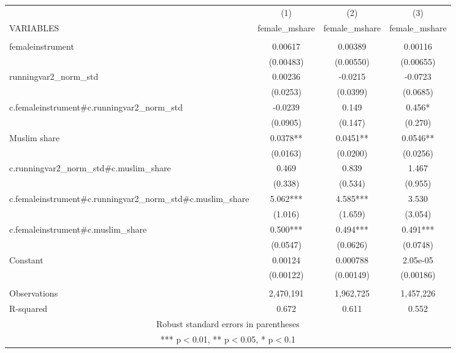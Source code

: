 \begin{tabular}{lccc} \hline
 & (1) & (2) & (3) \\
VARIABLES & female\_mshare & female\_mshare & female\_mshare \\ \hline
 &  &  &  \\
femaleinstrument & 0.00617 & 0.00389 & 0.00116 \\
 & (0.00483) & (0.00550) & (0.00655) \\
runningvar2\_norm\_std & 0.00236 & -0.0215 & -0.0723 \\
 & (0.0253) & (0.0399) & (0.0685) \\
c.femaleinstrument\#c.runningvar2\_norm\_std & -0.0239 & 0.149 & 0.456* \\
 & (0.0905) & (0.147) & (0.270) \\
Muslim share & 0.0378** & 0.0451** & 0.0546** \\
 & (0.0163) & (0.0200) & (0.0256) \\
c.runningvar2\_norm\_std\#c.muslim\_share & 0.469 & 0.839 & 1.467 \\
 & (0.338) & (0.534) & (0.955) \\
c.femaleinstrument\#c.runningvar2\_norm\_std\#c.muslim\_share & 5.062*** & 4.585*** & 3.530 \\
 & (1.016) & (1.659) & (3.054) \\
c.femaleinstrument\#c.muslim\_share & 0.500*** & 0.494*** & 0.491*** \\
 & (0.0547) & (0.0626) & (0.0748) \\
Constant & 0.00124 & 0.000788 & 2.05e-05 \\
 & (0.00122) & (0.00149) & (0.00186) \\
 &  &  &  \\
Observations & 2,470,191 & 1,962,725 & 1,457,226 \\
 R-squared & 0.672 & 0.611 & 0.552 \\ \hline
\multicolumn{4}{c}{ Robust standard errors in parentheses} \\
\multicolumn{4}{c}{ *** p$<$0.01, ** p$<$0.05, * p$<$0.1} \\
\end{tabular}
